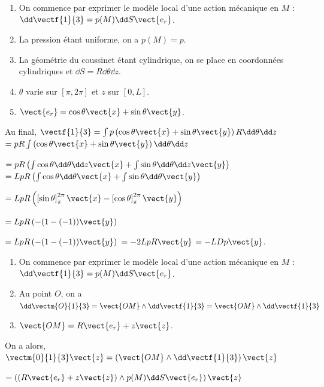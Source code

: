 \begin{corrigebox}
\begin{enumerate}
\item On commence par exprimer le modèle local d'une action mécanique en $M$ : $\dd \vectf{1}{3} = p(M) \dd S \vect{e_r}$.
\item La pression étant uniforme, on a $p(M)=p$.
\item La géométrie du coussinet étant cylindrique, on se place en coordonnées cylindriques et $\dd S = R\dd \theta \dd z$.  
\item $\theta$ varie sur $[\pi, 2\pi]$ et $z$ sur $[0,L]$. 
\item $\vect{e_r}=\cos\theta\vect{x}+\sin\theta\vect{y}$.
\end{enumerate}
Au final, $\vectf{1}{3}=\int p  \left( \cos\theta\vect{x}+\sin\theta\vect{y}\right)R\dd \theta \dd z$
$=pR\int \left( \cos\theta\vect{x}+\sin\theta\vect{y}\right)\dd \theta \dd z$

$=pR\left( \int  \cos\theta\dd \theta \dd z \vect{x}+\int \sin\theta\dd \theta \dd z   \vect{y}\right)$
$=LpR\left( \int  \cos\theta\dd \theta  \vect{x}+\int \sin\theta\dd \theta   \vect{y}\right)$

$=LpR\left( \left[ \sin \theta \right]^{2\pi}_{\pi}  \vect{x}-\left[\cos \theta \right]^{2\pi}_{\pi}   \vect{y}\right)$

$=LpR\left( -(1-(-1))   \vect{y}\right)$

$=LpR\left( -(1-(-1))   \vect{y}\right)$ $=-2LpR   \vect{y}$ $=-LDp   \vect{y}$.
\begin{enumerate}
\item On commence par exprimer le modèle local d'une action mécanique en $M$ : $\dd \vectf{1}{3} = p(M) \dd S \vect{e_r}$.
\item Au point $O$, on a $\dd \vectm{O}{1}{3}=\vect{OM}\wedge \dd \vectf{1}{3} =\vect{OM}\wedge \dd \vectf{1}{3} $
\item $\vect{OM}=R\vect{e_r}+z\vect{z}$.
\end{enumerate}
On a alors, $ \vectm{0}{1}{3}\vect{z} =\left( \vect{OM}\wedge \dd \vectf{1}{3}\right) \vect{z}$

$ = \left( \left( R\vect{e_r}+z\vect{z} \right) \wedge  p(M) \dd S \vect{e_r}\right) \vect{z}$


\end{corrigebox}
